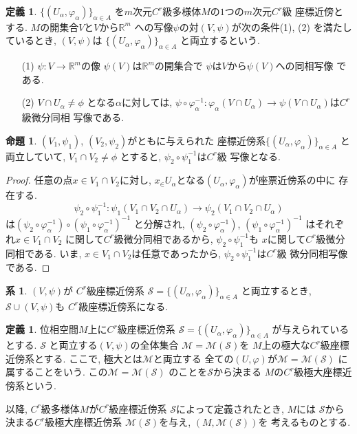 \documentclass[a4j,12pt]{jarticle}
\theoremstyle{definition}
\newtheorem{definition}[theorem]{定義}
\newtheorem{proposition}[theorem]{命題}
\newtheorem{corollary}[theorem]{系}
\begin{document}
\begin{definition}
    $\{(U_\alpha ,\varphi _\alpha)\}_{\alpha \in A}$
    を$m$次元$C^r$級多様体$M$の$1$つの$m$次元$C^r$級
    座標近傍とする. $M$の開集合$V$と$V$から$\mathbb{R}^m$
    への写像$\psi$の対$(V,\psi)$が次の条件(1), (2)
    を満たしているとき, $(V,\psi)$は
    $\{(U_\alpha ,\varphi _\alpha)\}_{\alpha \in A}$
    と両立するという. 
    \begin{itemize}
        \item[(1)]$\psi:V\to \mathbb{R}^m$の像
        $\psi (V)$は$\mathbb{R}^m$の開集合で
        $\psi$は$V$から$\psi (V)$への同相写像
        である. 
        \item[(2)] $V\cap U_\alpha \neq \phi$
        となる$\alpha$に対しては, 
        $\psi \circ \varphi_\alpha ^{-1}:
        \varphi_\alpha(V\cap U_\alpha)\to
        \psi(V\cap U_\alpha)$は$C^r$級微分同相
        写像である. 
    \end{itemize}
\begin{proposition}
    $(V_1,\psi_1)$, $(V_2,\psi_2)$がともに与えられた
    座標近傍系$\{(U_\alpha ,
    \varphi _\alpha)\}_{\alpha \in A}$
    と両立していて, $V_1\cap V_2\neq \phi$
    とすると, $\psi_2\circ \psi_1^{-1}$は$C^r$級
    写像となる. 
\end{proposition}
\begin{proof}
    任意の点$x\in V_1\cap V_2$に対し, 
    $x_\in U_\alpha$となる$(U_\alpha, 
    \varphi_\alpha)$が座票近傍系の中に
    存在する. 
    $$\psi_2\circ \psi_1^{-1}:
    \psi_1(V_1\cap V_2\cap U_\alpha)\to
    \psi_2(V_1\cap V_2\cap U_\alpha)$$
    は$(\psi_2\circ \varphi_\alpha^{-1})\circ
    (\psi_1\circ \varphi_\alpha^{-1})^{-1}$
    と分解され, 
    $(\psi_2\circ \varphi_\alpha^{-1})$, 
    $(\psi_1\circ \varphi_\alpha^{-1})^{-1}$
    はそれぞれ$x\in V_1\cap V_2$
    に関して$C^r$級微分同相であるから, 
    $\psi_2\circ \psi_1^{-1}$も
    $x$に関して$C^r$級微分同相である. いま, 
    $x\in V_1\cap V_2$は任意であったから, 
    $\psi_2\circ \psi_1^{-1}$は$C^r$級
    微分同相写像である. 
\end{proof}
\begin{corollary}
    $(V,\psi)$が
    $C^r$級座標近傍系
    $\mathcal{S}=
    \{(U_\alpha, \varphi_\alpha)\}_{\alpha\in A}$
    と両立するとき, $\mathcal{S}\cup (V,\psi)$も
    $C^r$級座標近傍系になる. 
\end{corollary}
\begin{definition}
    位相空間$M$上に$C^r$級座標近傍系
    $\mathcal{S}=
    \{(U_\alpha, \varphi_\alpha)\}_{\alpha\in A}$
    が与えられているとする. 
    $\mathcal{S}$
    と両立する$(V,\psi)$の全体集合
    $\mathcal{M}=\mathcal{M}(\mathcal{S})$を
    $M$上の極大な$C^r$級座標近傍系とする. 
    ここで, 極大とは$\mathcal{M}$と両立する
    全ての$(U,\varphi)$が$\mathcal{M}
    =\mathcal{M}(\mathcal{S})$
    に属することをいう. この$\mathcal{M}
    =\mathcal{M}(\mathcal{S})$
    のことを$\mathcal{S}$から決まる
    $M$の$C^r$級極大座標近傍系という. 
\end{definition}
以降, $C^r$級多様体$M$が$C^r$級座標近傍系
$\mathcal{S}$によって定義されたとき, $M$には
$\mathcal{S}$から決まる$C^r$級極大座標近傍系
$\mathcal{M}(\mathcal{S})$を与え, 
$(M,\mathcal{M}(\mathcal{S}))$を
考えるものとする. 
\end{definition}
\end{document}
